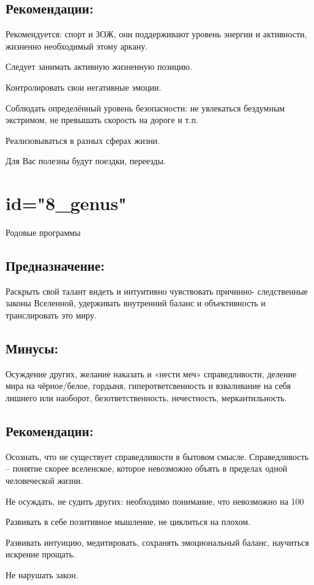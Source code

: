 \subsection{Рекомендации:}
\item Рекомендуется: спорт и ЗОЖ, они поддерживают уровень энергии 
и активности, жизненно необходимый этому аркану.
\item Следует занимать активную жизненную позицию.
\item Контролировать свои негативные эмоции.
\item Соблюдать определённый уровень безопасности: не увлекаться 
бездумным экстримом, не превышать скорость на дороге и т.п.
\item Реализовываться в разных сферах жизни.
\item Для Вас полезны будут поездки, переезды.
\endsubsection

\endsection

\section{id="8_genus"}{Родовые программы}

\subsection{Предназначение:}
Раскрыть свой талант видеть и интуитивно чувствовать причинно-
следственные законы Вселенной, удерживать внутренний баланс и 
объективность и транслировать это миру.
\endsubsection

\subsection{Минусы:}
Осуждение других, желание наказать и «нести меч» справедливости, 
деление мира на чёрное/белое, гордыня, гиперответсвенность и 
взваливание на себя лишнего или наоборот, безответственность, 
нечестность, меркантильность.
\endsubsection

\subsection{Рекомендации:}
\item Осознать, что не существует справедливости в бытовом смысле. 
Справедливость – понятие скорее вселенское, которое невозможно 
объять в пределах одной человеческой жизни.
\item Не осуждать, не судить других: необходимо понимание, что 
невозможно на 100%
\item Развивать в себе позитивное мышление, не циклиться на плохом.
\item Развивать интуицию, медитировать, сохранять эмоциональный 
баланс, научиться искренне прощать.
\item Не нарушать закон.
\endsubsection

